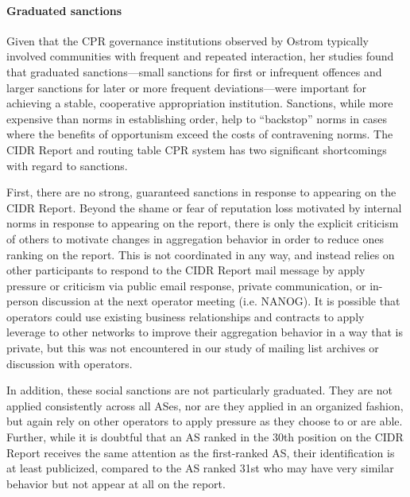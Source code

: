 \paragraph{Graduated sanctions}
Given that the CPR governance institutions observed by Ostrom typically
involved communities with frequent and repeated interaction, her studies found
that graduated sanctions---small sanctions for first or infrequent offences and
larger sanctions for later or more frequent deviations---were important for
achieving a stable, cooperative appropriation institution. Sanctions, while
more expensive than norms in establishing order, help to ``backstop'' norms in
cases where the benefits of opportunism exceed the costs of contravening norms.
The CIDR Report and routing table CPR system has two significant shortcomings
with regard to sanctions.

First, there are no strong, guaranteed sanctions in response to appearing on the
CIDR Report. Beyond the shame or fear of reputation loss motivated by internal
norms in response to appearing on the report, there is only the explicit
criticism of others to motivate changes in aggregation behavior in order to
reduce ones ranking on the report. This is not coordinated in any way, and
instead relies on other participants to respond to the CIDR Report mail message
by apply pressure or criticism via public email response, private
communication, or in-person discussion at the next operator meeting (i.e.
NANOG). It is possible that operators could use existing business relationships
and contracts to apply leverage to other networks to improve their aggregation
behavior in a way that is private, but this was not encountered in our study of
mailing list archives or discussion with operators.

In addition, these social sanctions are not particularly graduated. They are
not applied consistently across all ASes, nor are they applied in an organized
fashion, but again rely on other operators to apply pressure as they choose to
or are able. Further, while it is doubtful that an AS ranked in the 30th
position on the CIDR Report receives the same attention as the first-ranked AS,
their identification is at least publicized, compared to the AS ranked 31st who
may have very similar behavior but not appear at all on the report.

%
%

